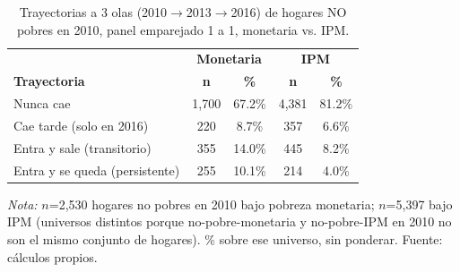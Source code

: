 \begin{table}[H]
  \centering
  \caption{Trayectorias a 3 olas (2010$\to$2013$\to$2016) de hogares
  NO pobres en 2010, panel emparejado 1 a 1, monetaria vs. IPM.}
  \label{tab:trayectorias_3olas}
  \footnotesize
  \begin{tabular}{lcccc}
    \toprule
    & \multicolumn{2}{c}{\textbf{Monetaria}} & \multicolumn{2}{c}{\textbf{IPM}} \\
    \textbf{Trayectoria} & \textbf{n} & \textbf{\%} & \textbf{n} & \textbf{\%} \\
    \midrule
    Nunca cae & 1{,}700 & 67.2\% & 4{,}381 & 81.2\% \\
    Cae tarde (solo en 2016) & 220 & 8.7\% & 357 & 6.6\% \\
    Entra y sale (transitorio) & 355 & 14.0\% & 445 & 8.2\% \\
    Entra y se queda (persistente) & 255 & 10.1\% & 214 & 4.0\% \\
    \bottomrule
  \end{tabular}
  \begin{minipage}{0.85\textwidth}
    \vspace{4pt}
    \footnotesize \textit{Nota:} $n$=2{,}530 hogares no pobres en 2010 bajo
    pobreza monetaria; $n$=5{,}397 bajo IPM (universos distintos porque
    no-pobre-monetaria y no-pobre-IPM en 2010 no son el mismo conjunto de
    hogares). \% sobre ese universo, sin ponderar. Fuente: cálculos
    propios.
  \end{minipage}
\end{table}